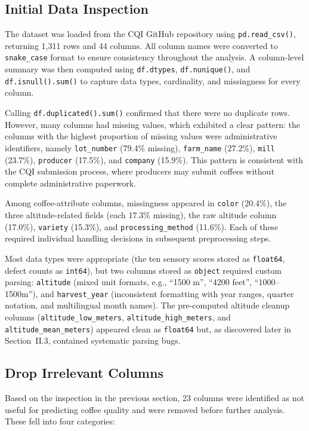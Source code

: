 \documentclass[12pt, a4paper]{article}
\begin{document}
\subsection{Initial Data Inspection}

The dataset was loaded from the CQI GitHub repository using \texttt{pd.read\_csv()}, returning
1,311 rows and 44 columns. All column names were converted to \texttt{snake\_case} format to
ensure consistency throughout the analysis. A column-level summary was then computed using
\texttt{df.dtypes}, \texttt{df.nunique()}, and \texttt{df.isnull().sum()} to capture data
types, cardinality, and missingness for every column.

Calling \texttt{df.duplicated().sum()} confirmed that there were no duplicate rows. However,
many columns had missing values, which exhibited a clear pattern: the columns with the highest
proportion of missing values were administrative identifiers, namely \texttt{lot\_number}
(79.4\% missing), \texttt{farm\_name} (27.2\%), \texttt{mill} (23.7\%), \texttt{producer}
(17.5\%), and \texttt{company} (15.9\%). This pattern is consistent with the CQI submission
process, where producers may submit coffees without complete administrative paperwork.

Among coffee-attribute columns, missingness appeared in \texttt{color} (20.4\%), the three
altitude-related fields (each 17.3\% missing), the raw altitude column (17.0\%),
\texttt{variety} (15.3\%), and \texttt{processing\_method} (11.6\%). Each of these required
individual handling decisions in subsequent preprocessing steps.

Most data types were appropriate (the ten sensory scores stored as \texttt{float64}, defect
counts as \texttt{int64}), but two columns stored as \texttt{object} required custom parsing:
\texttt{altitude} (mixed unit formats, e.g., ``1500 m'', ``4200 feet'', ``1000--1500m''), and
\texttt{harvest\_year} (inconsistent formatting with year ranges, quarter notation, and
multilingual month names). The pre-computed altitude cleanup columns
(\texttt{altitude\_low\_meters}, \texttt{altitude\_high\_meters}, and
\texttt{altitude\_mean\_meters}) appeared clean as \texttt{float64} but, as discovered later in
Section~II.3, contained systematic parsing bugs.

\subsection{Drop Irrelevant Columns}

Based on the inspection in the previous section, 23 columns were identified as not useful for
predicting coffee quality and were removed before further analysis. These fell into four categories:
\end{document}
